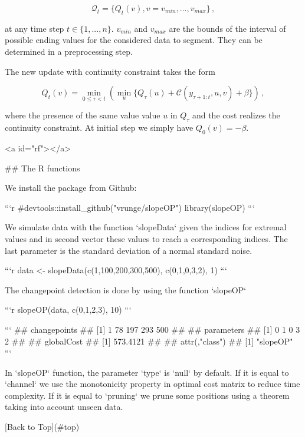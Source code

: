 $$
\mathcal{Q}_t = \{Q_t(v), v= v_{min},...,v_{max}\}\,,
$$

at any time step $t \in \{1,...,n\}$. $v_{min}$ and $v_{max}$ are the bounds of the interval of possible ending values for the considered data to segment. They can be determined in a preprocessing step.

The new update with continuity constraint takes the form

$$
Q_t(v) = \min_{0 \le \tau < t}\left( \min_{u}\{Q_{\tau}(u) + \mathcal{C}(y_{\tau+1:t},u,v) + \beta\}\right)\,,
$$

where the presence of the same value value $u$ in $Q_{\tau}$ and the cost realizes the continuity constraint. At initial step we simply have $Q_0(v) = -\beta$. 


<a id="rf"></a>

## The R functions

We install the package from Github:


```r
#devtools::install_github("vrunge/slopeOP")
library(slopeOP)
```

We simulate data with the function `slopeData` given the indices for extremal values and in second vector these values to reach a corresponding indices. The last parameter is the standard deviation of a normal standard noise.


```r
data <- slopeData(c(1,100,200,300,500), c(0,1,0,3,2), 1)
```

The changepoint detection is done by using the function `slopeOP`


```r
slopeOP(data, c(0,1,2,3), 10)
```

```
## changepoints
## [1]   1  78 197 293 500
## 
## parameters
## [1] 0 1 0 3 2
## 
## globalCost
## [1] 573.4121
## 
## attr(,"class")
## [1] "slopeOP"
```

In `slopeOP` function, the parameter `type` is `null` by default. If it is equal to `channel` we use the monotonicity property in optimal cost matrix to reduce time complexity. If it is equal to `pruning` we prune some positions using a theorem taking into account unseen data.


[Back to Top](#top)
